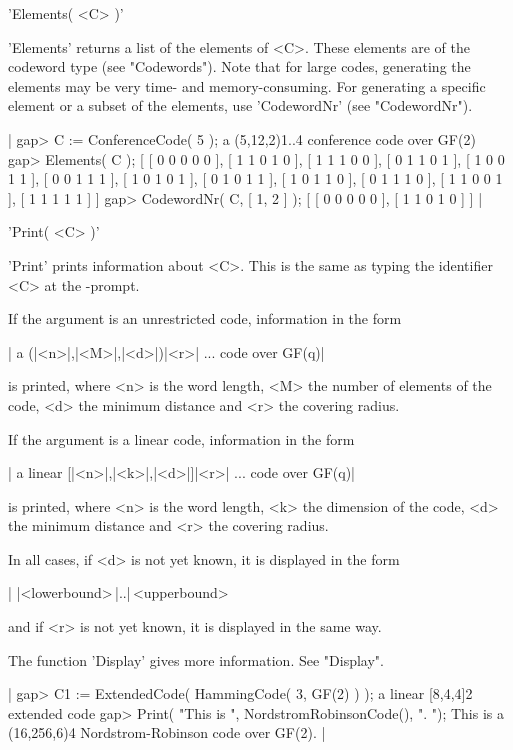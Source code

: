 'Elements( <C> )'

'Elements' returns a  list of the elements of  <C>. These elements are of
the  codeword type   (see   "Codewords"). Note   that for  large   codes,
generating  the   elements may  be very  time-  and memory-consuming. For
generating   a  specific  element  or  a   subset  of  the elements,  use
'CodewordNr' (see "CodewordNr").

|    gap> C := ConferenceCode( 5 );
    a (5,12,2)1..4 conference code over GF(2)
    gap> Elements( C );
    [ [ 0 0 0 0 0 ], [ 1 1 0 1 0 ], [ 1 1 1 0 0 ], [ 0 1 1 0 1 ],
      [ 1 0 0 1 1 ], [ 0 0 1 1 1 ], [ 1 0 1 0 1 ], [ 0 1 0 1 1 ],
      [ 1 0 1 1 0 ], [ 0 1 1 1 0 ], [ 1 1 0 0 1 ], [ 1 1 1 1 1 ] ]
    gap> CodewordNr( C, [ 1, 2 ] );
    [ [ 0 0 0 0 0 ], [ 1 1 0 1 0 ] ] |


'Print( <C> )'

'Print' prints information  about <C>.  This is the   same as typing  the
identifier <C> at the {\GAP}-prompt.

If the argument is an unrestricted code, information in the form

|    a (|<n>|,|<M>|,|<d>|)|<r>| ... code over GF(q)|

is printed, where <n> is the word length, <M> the number of elements of
the code, <d> the minimum distance and <r> the covering radius.

If the argument is a linear code, information in the form

|    a linear [|<n>|,|<k>|,|<d>|]|<r>| ... code over GF(q)|

is printed, where <n> is the word length, <k> the dimension of the code,
<d> the minimum distance and <r> the covering radius.

In all cases, if <d> is not yet known, it is displayed in the form

|    |<lowerbound>\,|..|\,<upperbound>

and if <r> is not yet known, it is displayed in the same way.

The function 'Display' gives more information. See "Display".

|    gap> C1 := ExtendedCode( HammingCode( 3, GF(2) ) );
    a linear [8,4,4]2 extended code
    gap> Print( "This is ", NordstromRobinsonCode(), ". \n");
    This is a (16,256,6)4 Nordstrom-Robinson code over GF(2). |


